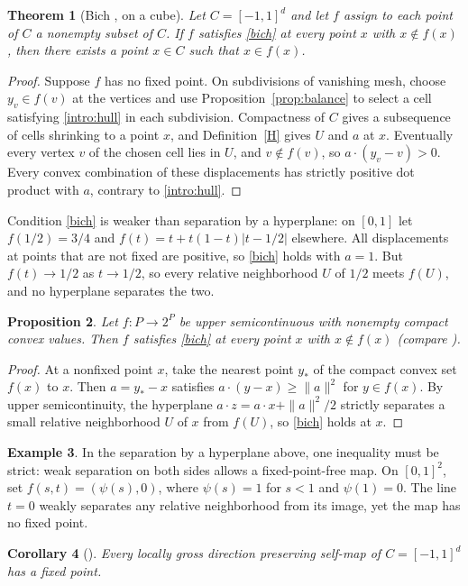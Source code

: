 \documentclass[11pt]{amsart}
\newtheorem{thm}{Theorem}[section]
\newtheorem{cor}[thm]{Corollary}
\newtheorem{prop}[thm]{Proposition}
\theoremstyle{definition}
\newtheorem{ex}[thm]{Example}
\theoremstyle{remark}
\numberwithin{equation}{section}
\begin{document}
\begin{thm}[{Bich \cite[Theorem~3.2]{Bich06}, on a cube}]\label{extensions}
Let $C=[-1,1]^d$ and let $f$ assign to each point of $C$ a nonempty subset of $C$. If $f$ satisfies \eqref{bich} at every point $x$ with $x\notin f(x)$, then there exists a point $x\in C$ such that $x\in f(x)$.
\end{thm}
\begin{proof}
Suppose $f$ has no fixed point. On subdivisions of vanishing mesh, choose $y_v\in f(v)$ at the vertices and use Proposition~\ref{prop:balance} to select a cell satisfying \eqref{intro:hull} in each subdivision. Compactness of $C$ gives a subsequence of cells shrinking to a point $x$, and Definition~\ref{H} gives $U$ and $a$ at $x$. Eventually every vertex $v$ of the chosen cell lies in $U$, and $v\notin f(v)$, so $a\cdot(y_v-v)>0$. Every convex combination of these displacements has strictly positive dot product with $a$, contrary to \eqref{intro:hull}.
\end{proof}
Condition \eqref{bich} is weaker than separation by a hyperplane: on $[0,1]$ let $f(1/2)=3/4$ and $f(t)=t+t(1-t)|t-1/2|$ elsewhere. All displacements at points that are not fixed are positive, so \eqref{bich} holds with $a=1$. But $f(t)\to1/2$ as $t\to1/2$, so every relative neighborhood $U$ of $1/2$ meets $f(U)$, and no hyperplane separates the two.
\begin{prop}\label{prop:usc-sep}
Let $f:P\to 2^P$ be upper semicontinuous with nonempty compact convex values. Then $f$ satisfies \eqref{bich} at every point $x$ with $x\notin f(x)$ (compare \cite[Remark~3.3]{Bich06}).
\end{prop}
\begin{proof}
At a nonfixed point $x$, take the nearest point $y_*$ of the compact convex set $f(x)$ to $x$. Then $a=y_*-x$ satisfies $a\cdot(y-x)\ge\|a\|^2$ for $y\in f(x)$. By upper semicontinuity, the hyperplane $a\cdot z=a\cdot x+\|a\|^2/2$ strictly separates a small relative neighborhood $U$ of $x$ from $f(U)$, so \eqref{bich} holds at $x$.
\end{proof}
\begin{ex}
In the separation by a hyperplane above, one inequality must be strict: weak separation on both sides allows a fixed-point-free map. On $[0,1]^2$, set $f(s,t)=(\psi(s),0)$, where $\psi(s)=1$ for $s<1$ and $\psi(1)=0$. The line $t=0$ weakly separates any relative neighborhood from its image, yet the map has no fixed point.
\end{ex}
\begin{cor}[{\cite{HLTY}}]\label{cor:hlty}
Every locally gross direction preserving self-map of $C=[-1,1]^d$ has a fixed point.
\end{cor}
\end{document}

